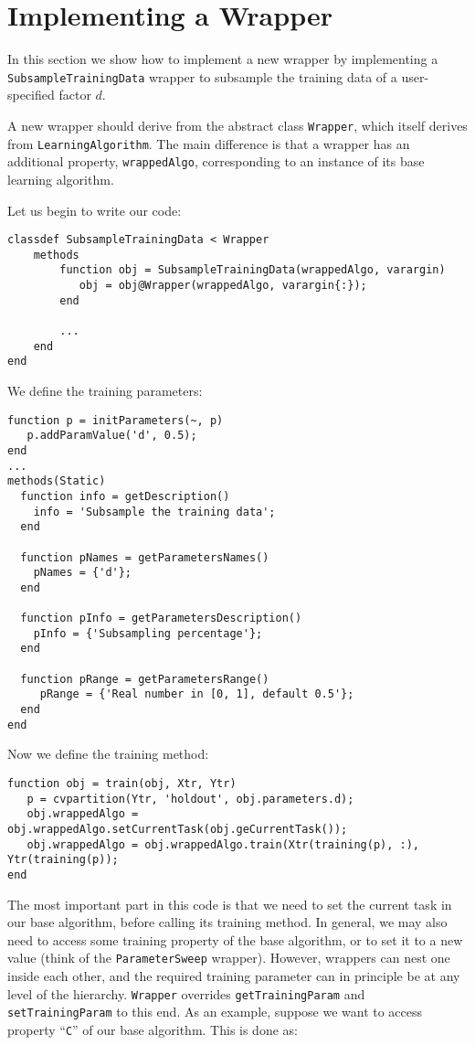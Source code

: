 \section{Implementing a Wrapper}

In this section we show how to implement a new wrapper by implementing a \verb|SubsampleTrainingData| wrapper to subsample the training data of a  user-specified factor $d$.

A new wrapper should derive from the abstract class \verb|Wrapper|, which itself derives from \verb|LearningAlgorithm|. The main difference is that a wrapper has an additional property, \verb|wrappedAlgo|, corresponding to an instance of its base learning algorithm.

Let us begin to write our code:


\begin{lstlisting}
classdef SubsampleTrainingData < Wrapper
	methods
		function obj = SubsampleTrainingData(wrappedAlgo, varargin)
		   obj = obj@Wrapper(wrappedAlgo, varargin{:});
		end
		
		...
	end
end
\end{lstlisting}

\noindent We define the training parameters:

\begin{lstlisting}
function p = initParameters(~, p)
   p.addParamValue('d', 0.5);
end
...
methods(Static)
  function info = getDescription()
    info = 'Subsample the training data';
  end
        
  function pNames = getParametersNames()
    pNames = {'d'}; 
  end
        
  function pInfo = getParametersDescription()
    pInfo = {'Subsampling percentage'};
  end
        
  function pRange = getParametersRange()
     pRange = {'Real number in [0, 1], default 0.5'};
  end 
end
\end{lstlisting}

\noindent Now we define the training method:

\begin{lstlisting}
function obj = train(obj, Xtr, Ytr)
   p = cvpartition(Ytr, 'holdout', obj.parameters.d);
   obj.wrappedAlgo = obj.wrappedAlgo.setCurrentTask(obj.geCurrentTask());
   obj.wrappedAlgo = obj.wrappedAlgo.train(Xtr(training(p), :), Ytr(training(p));
end
\end{lstlisting}

\noindent The most important part in this code is that we need to set the current task in our base algorithm, before calling its training method. In general, we may also need to access some training property of the base algorithm, or to set it to a new value (think of the \verb|ParameterSweep| wrapper). However, wrappers can nest one inside each other, and the required training parameter can in principle be at any level of the hierarchy. \verb|Wrapper| overrides \verb|getTrainingParam| and \verb|setTrainingParam| to this end. As an example, suppose we want to access property ``\verb|C|'' of our base algorithm. This is done as:

